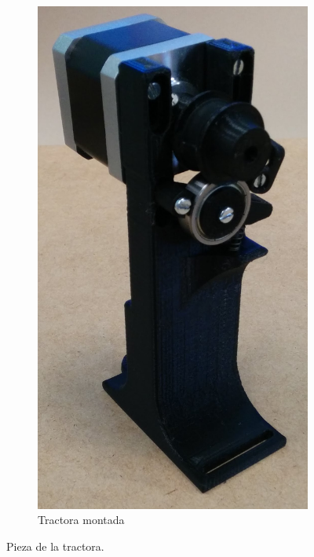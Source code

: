 \begin{figure}[H]
\begin{subfigure}[b]{0.3\textwidth}
                            \includegraphics[width=\linewidth]{images/producciones/tractora/IMG_20150804_090625.jpg}
                            \caption{Tractora montada}
                            \label{fig:tractora_montada}
                        \end{subfigure}
                        \caption{Pieza de la tractora.}
                        \label{fig:tractora_montaj}
            \end{figure}

